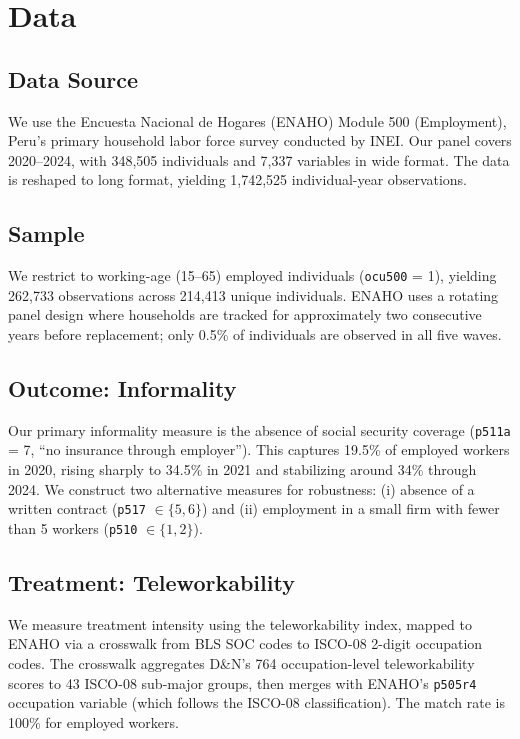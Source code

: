 \section{Data}
\label{sec:data}

\subsection{Data Source}

We use the Encuesta Nacional de Hogares (ENAHO) Module 500 (Employment), Peru's primary household labor force survey conducted by INEI. Our panel covers 2020--2024, with 348,505 individuals and 7,337 variables in wide format. The data is reshaped to long format, yielding 1,742,525 individual-year observations.

\subsection{Sample}

We restrict to working-age (15--65) employed individuals (\texttt{ocu500} = 1), yielding 262,733 observations across 214,413 unique individuals. ENAHO uses a rotating panel design where households are tracked for approximately two consecutive years before replacement; only 0.5\% of individuals are observed in all five waves.

\subsection{Outcome: Informality}

Our primary informality measure is the absence of social security coverage (\texttt{p511a} = 7, ``no insurance through employer''). This captures 19.5\% of employed workers in 2020, rising sharply to 34.5\% in 2021 and stabilizing around 34\% through 2024. We construct two alternative measures for robustness: (i) absence of a written contract (\texttt{p517} $\in \{5, 6\}$) and (ii) employment in a small firm with fewer than 5 workers (\texttt{p510} $\in \{1, 2\}$).

\subsection{Treatment: Teleworkability}

We measure treatment intensity using the \citet{dingel2020} teleworkability index, mapped to ENAHO via a crosswalk from BLS SOC codes to ISCO-08 2-digit occupation codes. The crosswalk aggregates D\&N's 764 occupation-level teleworkability scores to 43 ISCO-08 sub-major groups, then merges with ENAHO's \texttt{p505r4} occupation variable (which follows the ISCO-08 classification). The match rate is 100\% for employed workers.


